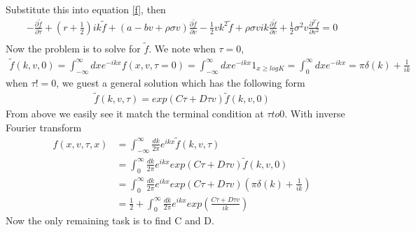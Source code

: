 \documentclass[a4paper]{article}
\begin{document}
Substitute this into equation \ref{f}, then
\begin{align*}
	-\frac{\partial \tilde f}{\partial \tau}
	+ (r + \frac{1}{2})ik \tilde f 
	+ (a-bv+\rho \sigma v)\frac{\partial \tilde f}{\partial v}
        -\frac{1}{2}vk^2 \tilde f 
	+ \rho \sigma v ik \frac{\partial \tilde f}{\partial v}
        +\frac{1}{2} \sigma^2 v \frac{\partial^2 \tilde f}{\partial v^2}  = 0\\
\end{align*}
Now the problem is to solve for $\tilde f$. We note when $\tau=0$,
\begin{align*}
	\tilde f(k, v, 0) = \int_{-\infty}^{\infty}dx e^{-ikx}f(x, v, \tau=0)
			  = \int_{-\infty}^{\infty}dx e^{-ikx}1_{x \geq logK}
			     = \int_{0}^{\infty}dx e^{-ikx}
			     = \pi \delta(k) + \frac{1}{ik}
\end{align*}
when $\tau!=0$, we guest a general solution which has the following form
\begin{align*}
	\tilde f(k, v, \tau) = exp(C\tau +D\tau v) \tilde f(k,v,0)
\end{align*}
From above we easily see it match the terminal condition at $\tau to 0$. With inverse Fourier transform
\begin{align*}
	f(x, v, \tau, x) & = \int_{-\infty}^{\infty}\frac{dk}{2\pi} e^{ikx} \tilde f(k, v, \tau)\\
			 & = \int_{0}^{\infty}\frac{dk}{2\pi} e^{ikx} exp(C\tau + D\tau v) \tilde f(k, v, 0)\\
			 & = \int_{0}^{\infty}\frac{dk}{2\pi} e^{ikx} exp(C\tau + D\tau v) 
			 	(\pi \delta(k) + \frac{1}{ik}) \\
			 & = \frac{1}{2} + \int_{0}^{\infty}\frac{dk}{2\pi} e^{ikx} exp(\frac{C\tau + D\tau v}{ik}) 
\end{align*}
Now the only remaining task is to find C and D.
\end{document}
